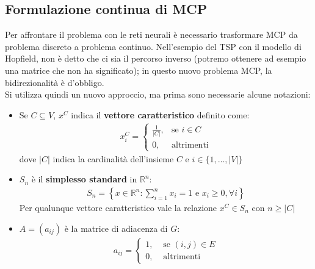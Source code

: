 \subsection{Formulazione continua di MCP} %
Per affrontare il problema con le reti neurali è necessario trasformare MCP da problema discreto a problema continuo. Nell'esempio del TSP con il modello di Hopfield, non è detto che ci sia il percorso inverso (potremo ottenere ad esempio una matrice che non ha significato); in questo nuovo problema MCP, la bidirezionalità è d'obbligo.\\

Si utilizza quindi un nuovo approccio, ma prima sono necessarie alcune notazioni:
\begin{itemize}
    \item Se $C \subseteq V$, $x^C$ indica il \textbf{vettore caratteristico} definito come:
    \begin{align*}
        x^C_i = 
        \begin{cases}
            \displaystyle\frac{1}{|C|}, &\text{se }i \in C\\
            0,  &\text {altrimenti}
        \end{cases}
    \end{align*}
    dove $|C|$ indica la cardinalità dell'insieme $C$ e $i \in \{ 1, \dots, |V|\}$
    \item $S_n$ è il \textbf{simplesso standard} in $\mathbb{R}^n$:
    \begin{align*}
        S_n = \left\{x \in \mathbb{R}^n : \sum_{i=1}^n x_i = 1 \text{ e } x_i \geq 0, \forall i \right\}
    \end{align*}
    Per qualunque vettore caratteristico vale la relazione $x^C \in S_n$ con $n \geq |C|$
    \item $A=(a_{ij})$ è la matrice di adiacenza di $G$:
    \begin{align*}
        a_{ij} =
        \begin{cases}
            1, &\text{ se } (i,j) \in E \\
            0, &\text{ altrimenti}
        \end{cases}
    \end{align*}
\end{itemize}

\newpage

